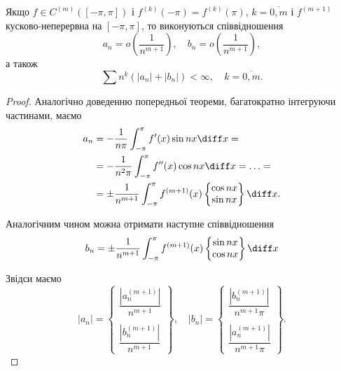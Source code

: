 \begin{theorem}
    Якщо $f \in C^{(m)}([-\pi, \pi])$ і $f^{(k)}(-\pi) = f^{(k)}(\pi)$, $k = \overline{0, m}$ і $f^{(m + 1)}$ кусково-неперервна на $[-\pi, \pi]$, то виконуються співвідношення
    \begin{equation}
        a_n = o \left( \frac{1}{n^{m + 1}} \right), \quad b_n = o \left( \frac{1}{n^{m + 1}} \right),
    \end{equation}
    а також
    \begin{equation}
        \sum n^k \left( |a_n| + |b_n| \right) < \infty, \quad k = \overline{0, m}.
    \end{equation}
\end{theorem}
\begin{proof}
    Аналогічно доведенню попередньої теореми, багатократно інтегруючи частинами, маємо
    \begin{equation}
        \begin{aligned}
            a_n
            &= -\frac{1}{n \pi} \int_{-\pi}^\pi f'(x) \sin n x \diff x = \\
            &= -\frac{1}{n^2 \pi} \int_{-\pi}^\pi f''(x) \cos n x \diff x = \ldots = \\
            &= \pm \frac{1}{n^{m + 1}} \int_{-\pi}^\pi f^{(m + 1)}(x) \begin{Bmatrix} \cos n x \\ \sin n x \end{Bmatrix} \diff x.
        \end{aligned}
    \end{equation}

    Аналогічним чином можна отримати наступне співвідношення
    \begin{equation}
        b_n = \pm \frac{1}{n^{m + 1}} \int_{-\pi}^\pi f^{(m + 1)}(x) \begin{Bmatrix} \sin n x \\ \cos n x \end{Bmatrix} \diff x
    \end{equation}

    Звідси маємо
    \begin{equation}
        |a_n| = \begin{Bmatrix} \dfrac{\left|a_n^{(m + 1)}\right|}{n^{m + 1}} \\ \\ \dfrac{\left|b_n^{(m + 1)}\right|}{n^{m + 1}} \end{Bmatrix}, \quad |b_n| = \begin{Bmatrix} \dfrac{\left|b_n^{(m + 1)}\right|}{n^{m + 1} \pi} \\ \\ \dfrac{\left|a_n^{(m + 1)}\right|}{n^{m + 1} \pi} \end{Bmatrix}.
    \end{equation}


\end{proof}
